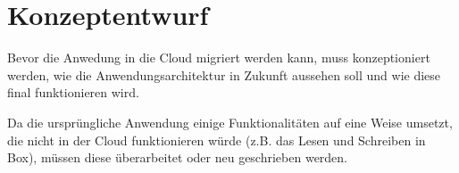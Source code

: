 \section{Konzeptentwurf}
Bevor die Anwedung in die Cloud migriert werden kann, muss konzeptioniert werden, wie die
Anwendungsarchitektur in Zukunft aussehen soll und wie diese final funktionieren wird.

Da die ursprüngliche Anwendung einige Funktionalitäten auf eine Weise umsetzt, die nicht in der
Cloud funktionieren würde (z.B. das Lesen und Schreiben in Box), müssen diese überarbeitet oder
neu geschrieben werden.
\pagebreak